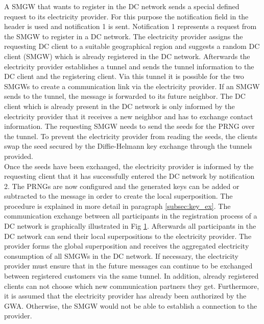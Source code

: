 \begin{figure}[tbp]
  \label{fig:sequencediagramregistering}
\end{figure}A \gls{SMGW} that wants to register in the DC network sends a special defined request to its electricity provider. For this purpose the notification field in the header is used and notification 1 is sent. Notification 1 represents a request from the \gls{SMGW} to register in a DC network. The electricity provider assigns the requesting DC client to a suitable geographical region and suggests a random DC client (\gls{SMGW}) which is already registered in the DC network. Afterwards the electricity provider establishes a tunnel and sends the tunnel information to the DC client and the registering client. Via this tunnel it is possible for the two \gls{SMGW}s to create a communication link via the electricity provider. If an \gls{SMGW} sends to the tunnel, the message is forwarded to its future neighbor. The DC client which is already present in the DC network is only informed by the electricity provider that it receives a new neighbor and has to exchange contact information. The requesting \gls{SMGW} needs to send the seeds for the \gls{PRNG} over the tunnel. To prevent the electricity provider from reading the seeds, the clients swap the seed secured by the Diffie-Helmann key exchange through the tunnels provided.\\%
Once the seeds have been exchanged, the electricity provider is informed by the requesting client that it has successfully entered the DC network by notification 2. The \gls{PRNG}s are now configured and the generated keys can be added or subtracted to the message in order to create the local superposition. The procedure is explained in more detail in paragraph \ref{subsec:key_ex}.%
The communication exchange between all participants in the registration process of a DC network is graphically illustrated in Fig \ref{fig:sequencediagramregistering}. %
Afterwards all participants in the DC network can send their local superpositions to the electricity provider. The provider forms the global superposition and receives the aggregated electricity consumption of all \gls{SMGW}s in the DC network. If necessary, the electricity provider must ensure that in the future messages can continue to be exchanged between registered customers via the same tunnel. In addition, already registered clients can not choose which new communication partners they get. Furthermore, it is assumed that the electricity provider has already been authorized by the \gls{GWA}. Otherwise, the \gls{SMGW} would not be able to establish a connection to the provider.\\
